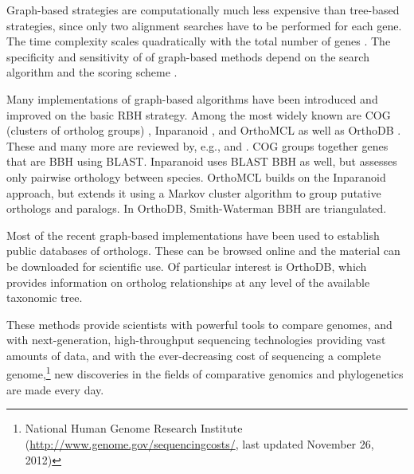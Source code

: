Graph-based strategies are computationally much less expensive than tree-based
strategies, since only two alignment searches have to be performed for each
gene. The time complexity scales quadratically with the total number of genes
\citep{altenhoff2012-1}. 
The specificity and sensitivity of of graph-based methods depend on the search
algorithm and the scoring scheme \citep{hulsen2006}.

Many implementations of graph-based algorithms have been introduced and improved
on the basic RBH strategy. Among the most widely known are COG (clusters of
ortholog groups) \citep{tatusov2003}, Inparanoid \citep{ostlund2010}, and
OrthoMCL \citep{li2003} as well as OrthoDB \citep{waterhouse2011}. These and
many more are reviewed by, e.g., \citet{kuzniar2008} and \citet{forslund2011}.
COG groups together genes that are BBH using BLAST. Inparanoid uses BLAST BBH as
well, but assesses only pairwise orthology between species. OrthoMCL builds on
the Inparanoid approach, but extends it using a Markov cluster algorithm to
group putative orthologs and paralogs. In OrthoDB, Smith-Waterman BBH are
triangulated.

Most of the recent graph-based implementations have been used to establish
public databases of orthologs. These can be browsed online and the material can
be downloaded for scientific use. Of particular interest is OrthoDB, which
provides information on ortholog relationships at any level of the available
taxonomic tree. 

These methods provide scientists with powerful tools to compare genomes, and
with next-generation, high-throughput sequencing technologies providing vast
amounts of data, and with the ever-decreasing cost of sequencing a complete
genome,\footnote{National Human Genome Research Institute
(\url{http://www.genome.gov/sequencingcosts/}, last updated November 26, 2012)}
new discoveries in the fields of comparative genomics and phylogenetics are made
every day. 

